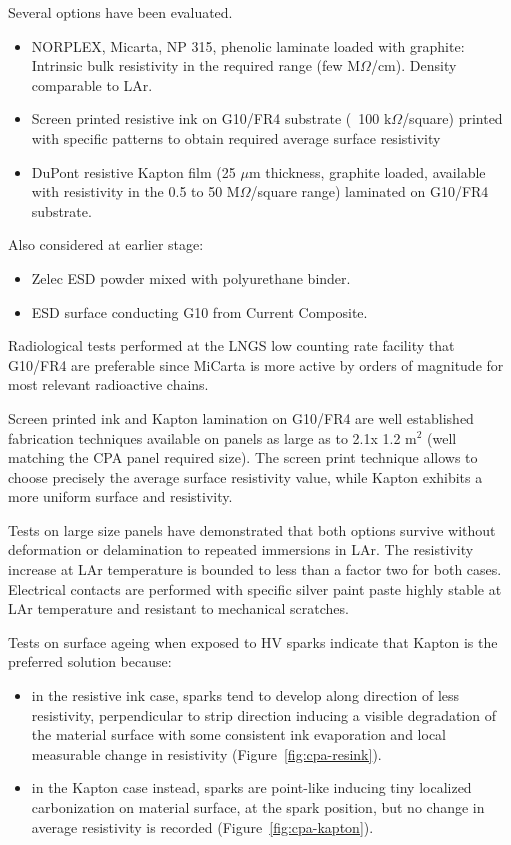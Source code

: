 Several options have been evaluated.
\begin{itemize}	
\item NORPLEX, Micarta, NP 315, phenolic laminate loaded with graphite: Intrinsic bulk resistivity in the required range (few M$\Omega$/cm). Density comparable to LAr.
\item Screen printed resistive ink on G10/FR4 substrate (~100 k$\Omega$/square) printed with specific patterns to obtain required average surface resistivity
\item DuPont resistive Kapton film  (25 $\mu$m thickness, graphite loaded, available with resistivity in the 0.5 to 50 M$\Omega$/square range) laminated on G10/FR4 substrate.
\end{itemize}
Also considered at earlier stage:
\begin{itemize}	
\item Zelec ESD powder mixed with polyurethane binder.
\item ESD surface conducting G10 from Current Composite.
\end{itemize}

Radiological tests performed at the LNGS low counting rate facility that G10/FR4 are preferable since MiCarta is more active by orders of magnitude for most relevant radioactive chains.
 
Screen printed ink and Kapton lamination on G10/FR4 are well established fabrication techniques available on panels as large as to 2.1x 1.2 m$^2$ (well matching the CPA panel required size). The screen print technique allows to choose precisely the average surface resistivity value, while Kapton exhibits a more uniform surface and resistivity. 

Tests on large size panels have demonstrated that both options survive without deformation or delamination to repeated immersions in LAr. The resistivity increase at LAr temperature is bounded to less than a factor two for both cases. Electrical contacts are performed with  specific  silver paint paste  highly stable at LAr temperature and resistant to mechanical scratches.

Tests on surface ageing when exposed to HV sparks indicate that Kapton is the preferred solution because:
\begin{itemize}	
\item in the resistive ink case, sparks tend to develop along direction of less resistivity, perpendicular to strip direction inducing a visible degradation of the material surface with some consistent ink evaporation and local measurable change in resistivity (Figure~\ref{fig:cpa-resink}).
\item in the Kapton case instead, sparks are point-like inducing tiny localized carbonization on material surface, at the spark position, but no change in average resistivity is recorded (Figure~\ref{fig:cpa-kapton}). 
\end{itemize}

